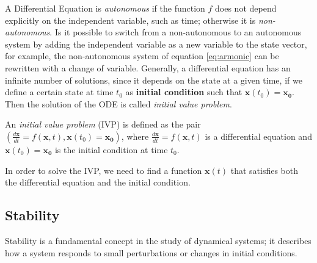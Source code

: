 A Differential Equation is \textit{autonomous} if the function $f$ does not depend explicitly on the independent variable, such as time; otherwise it is \textit{non-autonomous}.
Is it possible to switch from a non-autonomous to an autonomous system by adding the independent variable as a new variable to the state vector, for example, the
non-autonomous system of equation \ref{eq:armonic} can be rewritten with a change of variable.
\newline
Generally, a differential equation has an infinite number of solutions, since it depends on the state at a given time, if we define a certain state at time $t_0$ as \textbf{initial condition} such that $\mathbf{x}(t_0) = \mathbf{x_0}$.
Then the solution of the ODE is called \textit{initial value problem}.\newline
\begin{definition}
    An \textit{initial value problem} (IVP) is defined as the pair $(\frac{d\mathbf{x}}{dt} = f(\mathbf{x},t), \mathbf{x}(t_0) = \mathbf{x_0})$,
    where $\frac{d\mathbf{x}}{dt} = f(\mathbf{x},t)$ is a differential equation and $\mathbf{x}(t_0) = \mathbf{x_0}$ is the initial condition at time $t_0$.
\end{definition}
In order to solve the IVP, we need to find a function $\mathbf{x}(t)$ that satisfies both the differential equation and the initial condition.

\subsection{Stability}
Stability \cite{strogatz:2000} is a fundamental concept in the study of dynamical systems; it describes how a system responds to small perturbations or changes in initial conditions.

